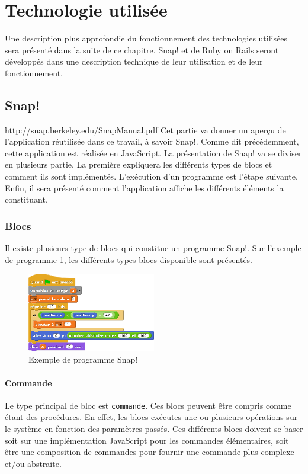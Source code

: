 \section{Technologie utilisée}
Une description plus approfondie du fonctionnement des technologies utilisées sera présenté dans la suite de ce chapitre. Snap! et de Ruby on Rails seront développés dans une description technique de leur utilisation et de leur fonctionnement.

\subsection{Snap!}
\url{http://snap.berkeley.edu/SnapManual.pdf}
Cet partie va donner un aperçu de l'application réutilisée dans ce travail, à savoir Snap!. Comme dit précédemment, cette application est réalisée en JavaScript. La présentation de Snap! va se diviser en plusieurs partie. La première expliquera les différents types de blocs et comment ils sont implémentés. L'exécution d'un programme est l'étape suivante. Enfin, il sera présenté comment l'application affiche les différents éléments la constituant.

\subsubsection{Blocs}
Il existe plusieurs type de blocs qui constitue un programme Snap!. Sur l'exemple de programme \ref{fig:software-used-script}, les différents types blocs disponible sont présentés.
\begin{figure}
  \begin{center}
    \includegraphics[width=0.5\textwidth]{content/5-related_work/images/script}
    \caption{Exemple de programme Snap!}
    \label{fig:software-used-script}
  \end{center}
\end{figure}

\paragraph{Commande}
Le type principal de bloc est \texttt{commande}. Ces blocs peuvent être compris comme étant des procédures. En effet, les blocs exécutes une ou plusieurs opérations sur le système en fonction des paramètres passés. Ces différents blocs doivent se baser soit sur une implémentation JavaScript pour les commandes élémentaires, soit être une composition de commandes pour fournir une commande plus complexe et/ou abstraite.

